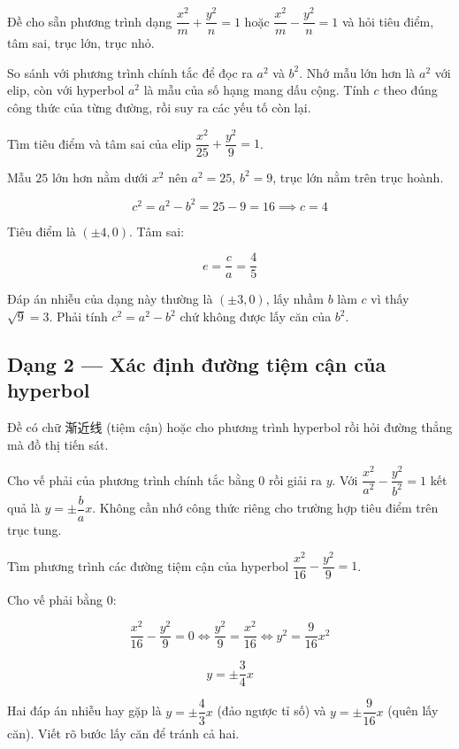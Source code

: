 \documentclass[11pt, a4paper]{article}
\begin{document}
 Đề cho sẵn phương trình dạng $\dfrac{x^2}{m} + \dfrac{y^2}{n} = 1$ hoặc $\dfrac{x^2}{m} - \dfrac{y^2}{n} = 1$ và hỏi tiêu điểm, tâm sai, trục lớn, trục nhỏ.

 So sánh với phương trình chính tắc để đọc ra $a^2$ và $b^2$. Nhớ mẫu lớn hơn là $a^2$ với elip, còn với hyperbol $a^2$ là mẫu của số hạng mang dấu cộng. Tính $c$ theo đúng công thức của từng đường, rồi suy ra các yếu tố còn lại.

\begin{vidu}[{1}]
Tìm tiêu điểm và tâm sai của elip $\dfrac{x^2}{25} + \dfrac{y^2}{9} = 1$.

Mẫu $25$ lớn hơn nằm dưới $x^2$ nên $a^2 = 25$, $b^2 = 9$, trục lớn nằm trên trục hoành.

$$c^2 = a^2 - b^2 = 25 - 9 = 16 \implies c = 4$$

Tiêu điểm là $(\pm 4, 0)$. Tâm sai:

$$e = \frac{c}{a} = \frac{4}{5}$$

 Đáp án nhiễu của dạng này thường là $(\pm 3, 0)$, lấy nhầm $b$ làm $c$ vì thấy $\sqrt{9} = 3$. Phải tính $c^2 = a^2 - b^2$ chứ không được lấy căn của $b^2$.

\end{vidu}
\subsection{Dạng 2 — Xác định đường tiệm cận của hyperbol}

 Đề có chữ 渐近线 (tiệm cận) hoặc cho phương trình hyperbol rồi hỏi đường thẳng mà đồ thị tiến sát.

 Cho vế phải của phương trình chính tắc bằng $0$ rồi giải ra $y$. Với $\dfrac{x^2}{a^2} - \dfrac{y^2}{b^2} = 1$ kết quả là $y = \pm\dfrac{b}{a}x$. Không cần nhớ công thức riêng cho trường hợp tiêu điểm trên trục tung.

\begin{vidu}[{2}]
Tìm phương trình các đường tiệm cận của hyperbol $\dfrac{x^2}{16} - \dfrac{y^2}{9} = 1$.

Cho vế phải bằng $0$:

$$\frac{x^2}{16} - \frac{y^2}{9} = 0 \iff \frac{y^2}{9} = \frac{x^2}{16} \iff y^2 = \frac{9}{16}x^2$$

$$y = \pm\frac{3}{4}x$$

 Hai đáp án nhiễu hay gặp là $y = \pm\dfrac{4}{3}x$ (đảo ngược tỉ số) và $y = \pm\dfrac{9}{16}x$ (quên lấy căn). Viết rõ bước lấy căn để tránh cả hai.

\end{vidu}
\end{document}

